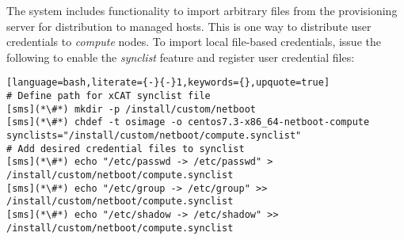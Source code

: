 The \xCAT{} system includes functionality to import arbitrary files from the
provisioning server for distribution to managed hosts. This is one way to
distribute user credentials to {\em compute} nodes. To import local file-based
credentials, issue the following to enable the {\em synclist} feature and
register user credential files:

\begin{lstlisting}[language=bash,literate={-}{-}1,keywords={},upquote=true]
# Define path for xCAT synclist file
[sms](*\#*) mkdir -p /install/custom/netboot
[sms](*\#*) chdef -t osimage -o centos7.3-x86_64-netboot-compute synclists="/install/custom/netboot/compute.synclist"
# Add desired credential files to synclist
[sms](*\#*) echo "/etc/passwd -> /etc/passwd" > /install/custom/netboot/compute.synclist
[sms](*\#*) echo "/etc/group -> /etc/group" >> /install/custom/netboot/compute.synclist
[sms](*\#*) echo "/etc/shadow -> /etc/shadow" >> /install/custom/netboot/compute.synclist

\end{lstlisting}
